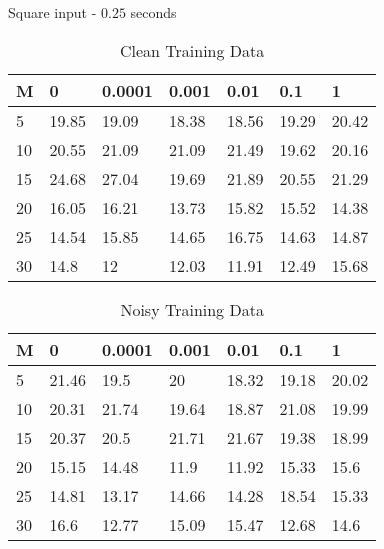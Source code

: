 \documentclass{beamer}
\begin{document}
\begin{frame}{Square input - $0.25$ seconds}
    \scriptsize
    \begin{table}[!ht]
        \centering
        \begin{tabular}{|l|l|l|l|l|l|l|}
        \hline
            M & 0 & 0.0001 & 0.001 & 0.01 & 0.1 & 1 \\ \hline
            5 & 19.85 & 19.09 & 18.38 & 18.56 & 19.29 & 20.42 \\ \hline
            10 & 20.55 & 21.09 & 21.09 & 21.49 & 19.62 & 20.16 \\ \hline
            15 & 24.68 & 27.04 & 19.69 & 21.89 & 20.55 & 21.29 \\ \hline
            20 & 16.05 & 16.21 & 13.73 & 15.82 & 15.52 & 14.38 \\ \hline
            25 & 14.54 & 15.85 & 14.65 & 16.75 & 14.63 & 14.87 \\ \hline
            30 & 14.8 & 12 & 12.03 & 11.91 & 12.49 & 15.68 \\ \hline
        \end{tabular}
        \caption{Clean Training Data}
    \end{table}

    \begin{table}[!ht]
        \centering
        \begin{tabular}{|l|l|l|l|l|l|l|}
        \hline
            M & 0 & 0.0001 & 0.001 & 0.01 & 0.1 & 1 \\ \hline
            5 & 21.46 & 19.5 & 20 & 18.32 & 19.18 & 20.02 \\ \hline
            10 & 20.31 & 21.74 & 19.64 & 18.87 & 21.08 & 19.99 \\ \hline
            15 & 20.37 & 20.5 & 21.71 & 21.67 & 19.38 & 18.99 \\ \hline
            20 & 15.15 & 14.48 & 11.9 & 11.92 & 15.33 & 15.6 \\ \hline
            25 & 14.81 & 13.17 & 14.66 & 14.28 & 18.54 & 15.33 \\ \hline
            30 & 16.6 & 12.77 & 15.09 & 15.47 & 12.68 & 14.6 \\ \hline
        \end{tabular}
        \caption{Noisy Training Data}
    \end{table}
\end{frame}
\end{document}
